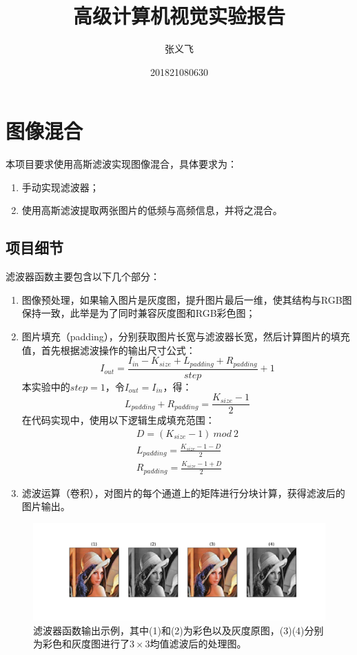 \documentclass{article}
\title{高级计算机视觉实验报告}
\author{张义飞}
\date{201821080630}
\begin{document}
\maketitle

\section{图像混合}
\begin{question}
    本项目要求使用高斯滤波实现图像混合，具体要求为：
    \begin{enumerate}
        \item 手动实现滤波器；
        \item 使用高斯滤波提取两张图片的低频与高频信息，并将之混合。
    \end{enumerate}
\end{question}

\subsection{项目细节}
滤波器函数主要包含以下几个部分：
\begin{enumerate}
    \item 图像预处理，如果输入图片是灰度图，提升图片最后一维，使其结构与RGB图保持一致，此举是为了同时兼容灰度图和RGB彩色图；
    \item 图片填充（padding），分别获取图片长宽与滤波器长宽，然后计算图片的填充值，首先根据滤波操作的输出尺寸公式：
    \begin{equation}
        I_{out}=\frac{I_{in}-K_{size}+L_{padding}+R_{padding}}{step}+1
    \end{equation}
    本实验中的$step=1$，令$I_{out}=I_{in}$，得：
    \begin{equation}
        L_{padding}+R_{padding}=\frac{K_{size}-1}{2}
    \end{equation}
    在代码实现中，使用以下逻辑生成填充范围：
    \begin{eqnarray}
        D=(K_{size}-1)\ mod\ 2 \\
        L_{padding}=\frac{K_{size}-1-D}{2} \\
        R_{padding}=\frac{K_{size}-1+D}{2}
    \end{eqnarray}
    \item 滤波运算（卷积），对图片的每个通道上的矩阵进行分块计算，获得滤波后的图片输出。
\end{enumerate}

\begin{figure}[h]
    \centering
    \includegraphics[width=\textwidth]{./project1/img/filter.pdf}
    \caption{滤波器函数输出示例，其中(1)和(2)为彩色以及灰度原图，(3)(4)分别为彩色和灰度图进行了$3\times 3$均值滤波后的处理图。}
\end{figure}
\end{document}
